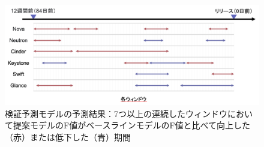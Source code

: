 \documentclass[11pt]{jreport}
\begin{document}
\begin{table}[t]
\caption{各プロジェクトの検証予測モデルにおける評価指標の回帰係数の分類}
\label{table:review_seino_jikeiretsu}
\centering
\vspace{0.5zh}
\end{table}

\begin{figure}[t]
\begin{center}
    \includegraphics[width=1.0\textwidth]{Uenaka_fig/RQ1_result/review_f1_window.pdf}
    \caption{検証予測モデルの予測結果：7つ以上の連続したウィンドウにおいて提案モデルのF値がベースラインモデルのF値と比べて向上した（赤）または低下した（青）期間}
    \label{fig:review_f1_window}
\end{center}
\end{figure}
\end{document}
